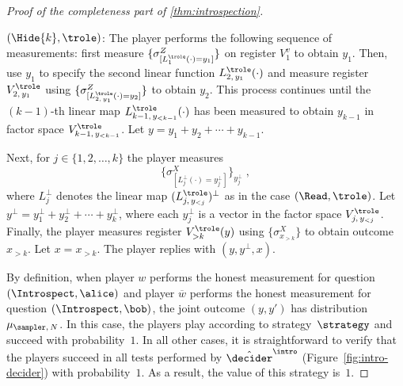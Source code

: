 \begin{proof}[Proof of the completeness part of \cref{thm:introspection}]
\begin{description}
  \item $(\Hide{k}, \trole)$:
    The player performs the following sequence of measurements: first measure
    $\{ \sigma^Z_{[L^\trole_{1}(\cdot) = y_{1}]} \}$ on register $V_1^v$ to
    obtain $y_1$.
    Then, use $y_1$ to specify the second linear function
    $L^\trole_{2,\, y_1}(\cdot)$ and measure register $V^\trole_{2,\,y_1}$ using
    $\{ \sigma^Z_{[L^\trole_{2,\, y_1}(\cdot) = y_{2}]} \}$ to obtain $y_2$.
    This process continues until the $(k-1)$-th linear map $L_{k-1,\, y_{<
        k-1}}^\trole(\cdot)$ has been measured to obtain $y_{k-1}$ in factor
    space $V_{k-1,\, y_{< k-1}}^\trole$.
    Let $y = y_1 + y_2 + \cdots + y_{k-1}$.
    
    Next, for $j \in \{1, 2, \ldots, k\}$ the player measures
    \begin{equation*}
      \Big \{ \sigma^X_{[L_{j}^\perp(\cdot) = y^\perp_{j}]} \Big \}_{y^\perp_j}\;,
    \end{equation*}
    where $L_j^\perp$ denotes the linear map $(L^\trole_{j,\, y_{<j}})^\perp$ as in
    the case $(\Read, \trole)$.
    Let $y^\perp = y_1^\perp + y_2^\perp + \cdots + y_k^\perp$, where each
    $y_j^\perp$ is a vector in the factor space $V^\trole_{j,\, y_{<j}}$.
    Finally, the player measures register $V_{> k}^\trole(y)$ using
    $\{\sigma^X_{x_{>k}}\}$ to obtain outcome $x_{> k}$.
    Let $x = x_{> k}$.
    The player replies with $(y,y^\perp,x)$.
\end{description}

By definition, when player $w$ performs the honest measurement for question
$(\Introspect, \alice)$ and player $\overline{w}$ performs the honest
measurement for question $(\Introspect, \bob)$, the joint outcome $(y, y')$ has
distribution $\mu_{\sampler,\, N}$.
In this case, the players play according to strategy~$\strategy$ and succeed
with probability~$1$.
In all other cases, it is straightforward to verify that the players succeed in
all tests performed by $\tdint$ (Figure~\ref{fig:intro-decider}) with
probability~$1$.
As a result, the value of this strategy is~$1$. 


\end{proof}
